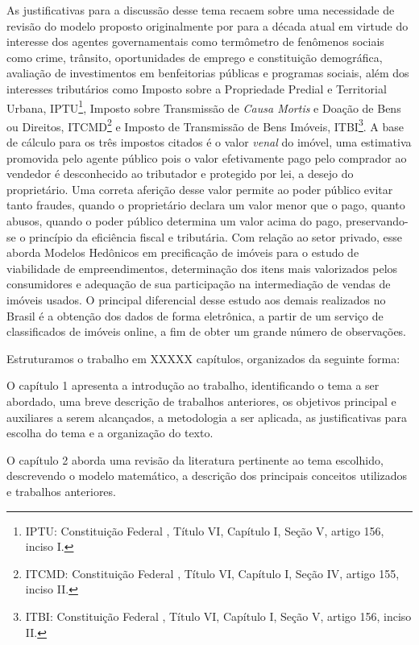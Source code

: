 As justificativas para a discussão desse tema recaem sobre uma necessidade de revisão do modelo proposto originalmente por \cite{Neto} para a década atual em virtude do interesse dos agentes governamentais como termômetro de fenômenos sociais como crime, trânsito, oportunidades de emprego e constituição demográfica,  avaliação de investimentos em benfeitorias públicas e programas sociais, além dos interesses tributários como Imposto sobre a Propriedade Predial e Territorial Urbana, IPTU\footnote{IPTU: Constituição Federal , Título VI, Capítulo I, Seção V, artigo 156, inciso I.}, Imposto sobre Transmissão de \textit{Causa Mortis} e Doação de Bens ou Direitos, ITCMD\footnote{ITCMD: Constituição Federal , Título VI, Capítulo I, Seção IV, artigo 155, inciso II. } e Imposto de Transmissão de Bens Imóveis, ITBI\footnote{ITBI: Constituição Federal , Título VI, Capítulo I, Seção V, artigo 156, inciso II.}. A base de cálculo para os três impostos citados é o valor \textit{venal} do imóvel, uma estimativa promovida pelo agente público pois o valor efetivamente pago pelo comprador ao vendedor é desconhecido ao tributador e protegido por lei, a desejo do proprietário. Uma correta aferição desse valor permite ao poder público evitar tanto fraudes, quando o proprietário declara um valor menor que o pago, quanto abusos, quando o poder público determina um valor acima do pago, preservando-se o princípio da eficiência fiscal e tributária. Com relação ao setor privado, esse aborda Modelos Hedônicos em precificação de imóveis para o estudo de viabilidade de empreendimentos, determinação dos itens mais valorizados pelos consumidores e adequação de sua participação na intermediação de vendas de imóveis usados. O principal diferencial desse estudo aos demais realizados no Brasil é a obtenção dos dados de forma eletrônica, a partir de um serviço de classificados de imóveis online, a fim de obter um grande número de observações. 

Estruturamos o trabalho em XXXXX capítulos, organizados da seguinte forma:

O capítulo 1 apresenta a introdução ao trabalho, identificando o tema a ser abordado, uma breve descrição de trabalhos anteriores, os objetivos principal e auxiliares a serem alcançados, a metodologia a ser aplicada, as justificativas para escolha do tema e a organização do texto.

O capítulo 2 aborda uma revisão da literatura pertinente ao tema escolhido, descrevendo o modelo matemático, a descrição dos principais conceitos utilizados e trabalhos anteriores.

